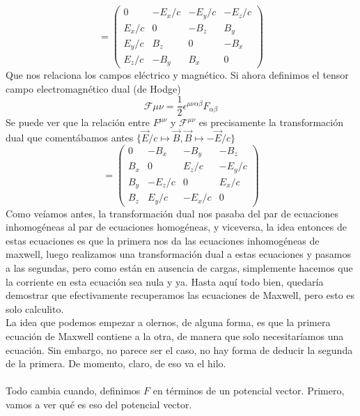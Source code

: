 \documentclass[12pt]{article}
\begin{document}
\begin{equation}
    [F^{\mu \nu}] =\begin{pmatrix}
        0 & -E_x/c & -E_y/c & -E_z/c \\
        E_x/c & 0 & -B_z & B_y \\ 
        E_y/c & B_z& 0& -B_x \\
        E_z/c &-B_y & B_x&0 
    \end{pmatrix}
\end{equation}
Que nos relaciona los campos eléctrico y magnético. Si ahora definimos el tensor campo electromagnético dual (de Hodge) 
\begin{equation}
    \mathcal{F}{\mu \nu} = \frac{1}{2}\epsilon^{\mu \nu \alpha \beta } F_{\alpha \beta}
\end{equation} 
Se puede ver que la relación entre $F^{\mu \nu}$ y $\mathcal{F}^{\mu \nu}$ es precisamente la transformación dual que comentábamos antes $\{\vec E/c\mapsto \vec B, \vec B \mapsto -\vec E/c\}$
\begin{equation}
    [\mathcal{F}^{\mu \nu}] =\begin{pmatrix}
        0 & -B_x & -B_y & -B_z\\
        B_x & 0 & E_z/c& -E_y/c \\ 
        B_y & -E_z/c& 0& E_x/c \\
        B_z &E_y/c &-E_x/c&0 
    \end{pmatrix}
\end{equation}
Como veíamos antes, la transformación dual nos pasaba del par de ecuaciones inhomogéneas al par de ecuaciones homogéneas, y viceversa, la idea entonces de estas ecuaciones es que la primera nos da las ecuaciones inhomogéneas de maxwell, luego realizamos una transformación dual a estas ecuaciones y pasamos a las segundas, pero como están en ausencia de cargas, simplemente hacemos que la corriente en esta ecuación sea nula y ya. Hasta aquí todo bien, quedaría demostrar que efectivamente recuperamos las ecuaciones de Maxwell, pero esto es solo calculito. \\ La idea que podemos empezar a olernos, de alguna forma, es que la primera ecuación de Maxwell contiene a la otra, de manera que solo necesitaríamos una ecuación. Sin embargo, no parece ser el caso, no hay forma de deducir la segunda de la primera. De momento, claro, de eso va el hilo.\\\\
Todo cambia cuando, definimos $F$ en términos de un potencial vector. Primero, vamos a ver qué es eso del potencial vector. \\
\end{document}
